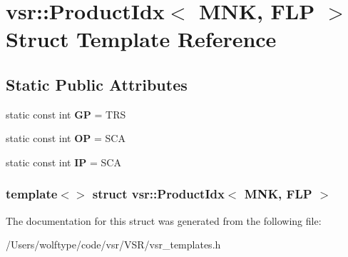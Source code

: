 \hypertarget{structvsr_1_1_product_idx_3_01_m_n_k_00_01_f_l_p_01_4}{\section{vsr\-:\-:Product\-Idx$<$ M\-N\-K, F\-L\-P $>$ Struct Template Reference}
\label{structvsr_1_1_product_idx_3_01_m_n_k_00_01_f_l_p_01_4}
}
\subsection*{Static Public Attributes}
\begin{DoxyCompactItemize}
\item 
\hypertarget{structvsr_1_1_product_idx_3_01_m_n_k_00_01_f_l_p_01_4_a862a000d1153eecc2a278e15a668e489}{static const int {\bfseries G\-P} = T\-R\-S}\label{structvsr_1_1_product_idx_3_01_m_n_k_00_01_f_l_p_01_4_a862a000d1153eecc2a278e15a668e489}

\item 
\hypertarget{structvsr_1_1_product_idx_3_01_m_n_k_00_01_f_l_p_01_4_a39b875899a8d3ed6c0eca2dba3980e62}{static const int {\bfseries O\-P} = S\-C\-A}\label{structvsr_1_1_product_idx_3_01_m_n_k_00_01_f_l_p_01_4_a39b875899a8d3ed6c0eca2dba3980e62}

\item 
\hypertarget{structvsr_1_1_product_idx_3_01_m_n_k_00_01_f_l_p_01_4_a73ad76917638881b2ed7440185b02a3b}{static const int {\bfseries I\-P} = S\-C\-A}\label{structvsr_1_1_product_idx_3_01_m_n_k_00_01_f_l_p_01_4_a73ad76917638881b2ed7440185b02a3b}

\end{DoxyCompactItemize}
\subsubsection*{template$<$$>$ struct vsr\-::\-Product\-Idx$<$ M\-N\-K, F\-L\-P $>$}



The documentation for this struct was generated from the following file\-:\begin{DoxyCompactItemize}
\item 
/\-Users/wolftype/code/vsr/\-V\-S\-R/vsr\-\_\-templates.\-h\end{DoxyCompactItemize}
